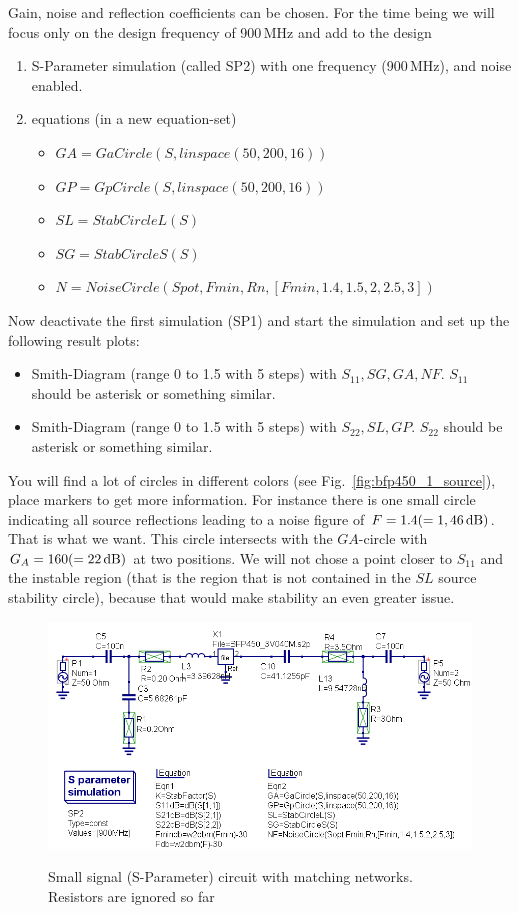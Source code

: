 Gain, noise and reflection coefficients can be chosen. For the
time being we will focus only on the design frequency of 900\,MHz
and add to the design
\begin{enumerate}
\item S-Parameter simulation (called SP2) with one frequency (900\,MHz), and noise
  enabled.
\item equations (in a new equation-set)
  \begin{itemize}
  \item $GA=GaCircle(S,linspace(50,200,16))$
  \item $GP=GpCircle(S,linspace(50,200,16))$
  \item $SL=StabCircleL(S)$
  \item $SG=StabCircleS(S)$
  \item $N=NoiseCircle(Spot,Fmin,Rn,[Fmin,1.4,1.5,2,2.5,3])$
  \end{itemize}
\end{enumerate}
Now deactivate the first simulation (SP1) and start the simulation and
set up the following result plots:
\begin{itemize}
\item Smith-Diagram (range 0 to 1.5 with 5 steps) with
  $S_{11},SG,GA,NF$. $S_{11}$ should be asterisk or something similar.
\item Smith-Diagram (range 0 to 1.5 with 5 steps) with
  $S_{22},SL,GP$.  $S_{22}$ should be asterisk or something similar.
\end{itemize}
You will find a lot of circles in different colors (see
Fig.~\ref{fig:bfp450_1_source}), place markers to get more
information. For instance there is one small circle indicating all
source reflections leading to a noise figure of
$F=1.4(=1,46\,\mathrm{dB})$. That is what we want. This circle
intersects with the $GA$-circle with $G_A=160(=22\,\mathrm{dB})$ at two
positions. We will not chose a point closer to $S_{11}$ and the
instable region (that is the region that is not contained in the $SL$
source stability circle), because that would make stability an even
greater issue.

\begin{figure}
  \centering
  {\includegraphics[width=12cm]{bfp450_1a_match.png}}
  \caption{Small signal (S-Parameter) circuit with matching
    networks. Resistors are ignored so far}
  \label{fig:bfp450_1a_match}
\end{figure}

